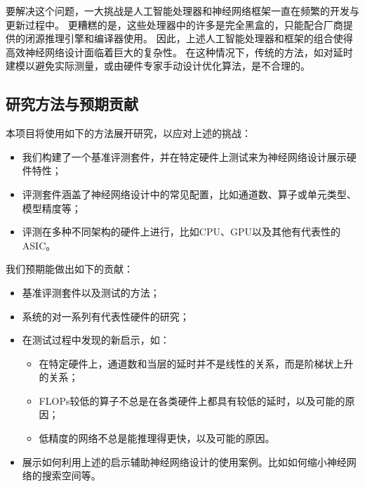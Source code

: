 要解决这个问题，一大挑战是人工智能处理器和神经网络框架一直在频繁的开发与更新过程中。
更糟糕的是，这些处理器中的许多是完全黑盒的，只能配合厂商提供的闭源推理引擎和编译器使用。
因此，上述人工智能处理器和框架的组合使得高效神经网络设计面临着巨大的复杂性。
在这种情况下，传统的方法，如对延时建模以避免实际测量，或由硬件专家手动设计优化算法，是不合理的。

\subsection{研究方法与预期贡献}
本项目将使用如下的方法展开研究，以应对上述的挑战：
\begin{itemize}
    \item 我们构建了一个基准评测套件，并在特定硬件上测试来为神经网络设计展示硬件特性；
    \item 评测套件涵盖了神经网络设计中的常见配置，比如通道数、算子或单元类型、模型精度等；
    \item 评测在多种不同架构的硬件上进行，比如CPU、GPU以及其他有代表性的ASIC。
\end{itemize}

我们预期能做出如下的贡献：
\begin{itemize}
    \item 基准评测套件以及测试的方法；
    \item 系统的对一系列有代表性硬件的研究；
    \item 在测试过程中发现的新启示，如：
    \begin{itemize}
        \item 在特定硬件上，通道数和当层的延时并不是线性的关系，而是阶梯状上升的关系；
        \item FLOPs较低的算子不总是在各类硬件上都具有较低的延时，以及可能的原因；
        \item 低精度的网络不总是能推理得更快，以及可能的原因。
    \end{itemize}
    \item 展示如何利用上述的启示辅助神经网络设计的使用案例。比如如何缩小神经网络的搜索空间等。
\end{itemize}